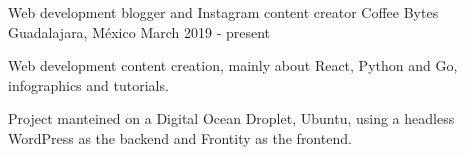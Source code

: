 \begin{cventries}
  \cventry
    {Web development blogger and Instagram content creator}
    {Coffee Bytes}
    {Guadalajara, México}
    {March 2019 - present}
    {
      \begin{cvitems}
        \item {Web development content creation, mainly about React, Python and Go, infographics and tutorials.}
        \item {Project manteined on a Digital Ocean Droplet, Ubuntu, using a headless WordPress as the backend and Frontity as the frontend.}
      \end{cvitems}
    }

\end{cventries}

